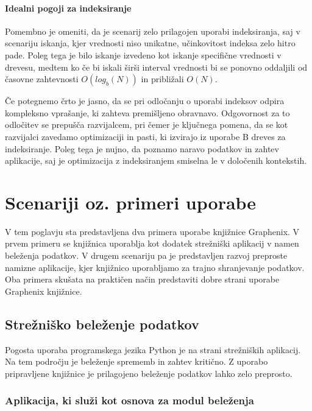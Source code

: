 \documentclass[a4paper,12pt,openright]{book}
\begin{document}
    \subsubsection{Idealni pogoji za indeksiranje}
    Pomembno je omeniti, da je scenarij zelo prilagojen uporabi indeksiranja, saj v scenariju iskanja, kjer vrednosti niso unikatne, učinkovitost indeksa zelo hitro pade. Poleg tega je bilo iskanje izvedeno kot iskanje specifične vrednosti v drevesu, medtem ko če bi iskali širši interval vrednosti bi se ponovno oddaljili od časovne zahtevnosti $O(log_b(N))$ in približali $O(N)$.

    Če potegnemo črto je jasno, da se pri odločanju o uporabi indeksov odpira kompleksno vprašanje, ki zahteva premišljeno obravnavo. Odgovornost za to odločitev se prepušča razvijalcem, pri čemer je ključnega pomena, da se kot razvijalci zavedamo optimizaciji in pasti, ki izvirajo iz uporabe B dreves za indeksiranje. Poleg tega je nujno, da poznamo naravo podatkov in zahtev aplikacije, saj je optimizacija z indeksiranjem smiselna le v določenih kontekstih.

\chapter{Scenariji oz. primeri uporabe}
\label{ch3}

    V tem poglavju sta predstavljena dva primera uporabe knjižnice Graphenix. V prvem primeru se knjižnica uporablja kot dodatek strežniški aplikacij v namen beleženja podatkov. V drugem scenariju pa je predstavljen razvoj preproste namizne aplikacije, kjer knjižnico uporabljamo za trajno shranjevanje podatkov. Oba primera skušata na praktičen način predstaviti dobre strani uporabe Graphenix knjižnice.

    \section{Strežniško beleženje podatkov}

    Pogosta uporaba programskega jezika Python je na strani strežniških aplikacij. Na tem področju je beleženje sprememb in zahtev kritično. Z uporabo pripravljene knjižnice je prilagojeno beleženje podatkov lahko zelo preprosto.

    \subsection{Aplikacija, ki služi kot osnova za modul beleženja}
\end{document}
